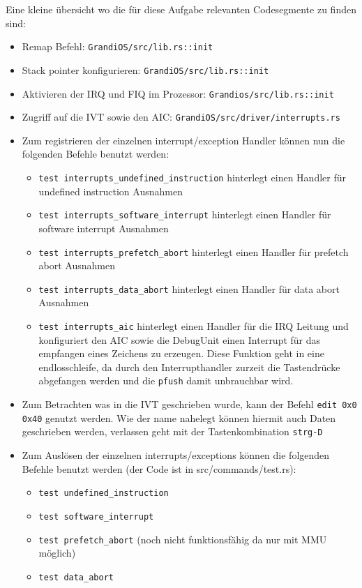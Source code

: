 \begin{description}
Eine kleine übersicht wo die für diese Aufgabe relevanten Codesegmente zu finden sind:
\begin{itemize}
	\item Remap Befehl: \texttt{GrandiOS/src/lib.rs::init}
	\item Stack pointer konfigurieren: \texttt{GrandiOS/src/lib.rs::init}
	\item Aktivieren der IRQ und FIQ im Prozessor: \texttt{Grandios/src/lib.rs::init}
	\item Zugriff auf die IVT sowie den AIC: \texttt{GrandiOS/src/driver/interrupts.rs}
	\item Zum registrieren der einzelnen interrupt/exception Handler können nun die folgenden Befehle benutzt werden:
	\begin{itemize}
		\item \texttt{test interrupts\_undefined\_instruction} hinterlegt einen Handler für undefined instruction Ausnahmen
		\item \texttt{test interrupts\_software\_interrupt} hinterlegt einen Handler für software interrupt Ausnahmen
		\item \texttt{test interrupts\_prefetch\_abort} hinterlegt einen Handler für prefetch abort Ausnahmen
		\item \texttt{test interrupts\_data\_abort} hinterlegt einen Handler für data abort Ausnahmen
		\item \texttt{test interrupts\_aic} hinterlegt einen Handler für die IRQ Leitung und konfiguriert den AIC sowie die DebugUnit einen Interrupt für das empfangen eines Zeichens zu erzeugen. Diese Funktion geht in eine endlosschleife, da durch den Interrupthandler zurzeit die Tastendrücke abgefangen werden und die \texttt{pfush} damit unbrauchbar wird.
	\end{itemize}
	\item Zum Betrachten was in die IVT geschrieben wurde, kann der Befehl \texttt{edit 0x0 0x40} genutzt werden. Wie der name nahelegt können hiermit auch Daten geschrieben werden, verlassen geht mit der Tastenkombination \texttt{strg-D}
        \item Zum Auslösen der einzelnen interrupts/exceptions können die folgenden Befehle benutzt werden (der Code ist in src/commands/test.rs):
	\begin{itemize}
		\item \texttt{test undefined\_instruction}
		\item \texttt{test software\_interrupt}
		\item \texttt{test prefetch\_abort} (noch nicht funktionsfähig da nur mit MMU möglich)
		\item \texttt{test data\_abort}
	\end{itemize}
\end{itemize}

\end{description}

